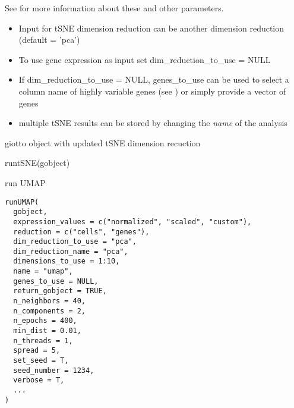 \documentclass[a4paper]{book}
\begin{document}
\begin{Details}\relax
See  for more information about these and other parameters. \\{}
\begin{itemize}

\item{} Input for tSNE dimension reduction can be another dimension reduction (default = 'pca')
\item{} To use gene expression as input set dim\_reduction\_to\_use = NULL
\item{} If dim\_reduction\_to\_use = NULL, genes\_to\_use can be used to select a column name of
highly variable genes (see ) or simply provide a vector of genes
\item{} multiple tSNE results can be stored by changing the \emph{name} of the analysis

\end{itemize}

\end{Details}
%
\begin{Value}
giotto object with updated tSNE dimension recuction
\end{Value}
%
\begin{Examples}
\begin{ExampleCode}
    runtSNE(gobject)
\end{ExampleCode}
\end{Examples}
%
\begin{Description}\relax
run UMAP
\end{Description}
%
\begin{Usage}
\begin{verbatim}
runUMAP(
  gobject,
  expression_values = c("normalized", "scaled", "custom"),
  reduction = c("cells", "genes"),
  dim_reduction_to_use = "pca",
  dim_reduction_name = "pca",
  dimensions_to_use = 1:10,
  name = "umap",
  genes_to_use = NULL,
  return_gobject = TRUE,
  n_neighbors = 40,
  n_components = 2,
  n_epochs = 400,
  min_dist = 0.01,
  n_threads = 1,
  spread = 5,
  set_seed = T,
  seed_number = 1234,
  verbose = T,
  ...
)
\end{verbatim}
\end{Usage}
%
\end{document}
